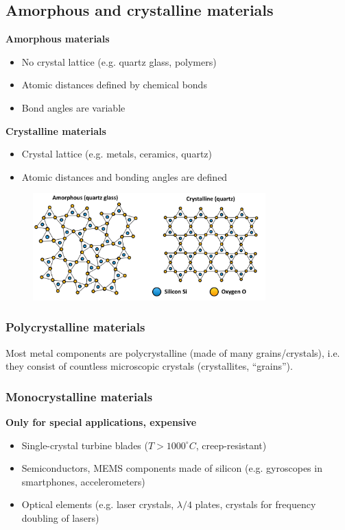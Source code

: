\documentclass{article}
\begin{document}
\subsection{Amorphous and crystalline materials}
\begin{minipage}[t]{0.48\textwidth}
  \textbf{Amorphous materials}
  \begin{itemize}
    \item No crystal lattice (e.g. quartz glass, polymers)
    \item Atomic distances defined by chemical bonds
    \item Bond angles are variable
  \end{itemize}
\end{minipage}
\hfill
\begin{minipage}[t]{0.48\textwidth}
  \textbf{Crystalline materials}
  \begin{itemize}
    \item Crystal lattice (e.g. metals, ceramics, quartz)
    \item Atomic distances and bonding angles are defined
  \end{itemize}
\end{minipage}

\newpage
\begin{figure}[ht!]
  \centering
  \includegraphics[width=0.8\textwidth]{media/amorph_cry.png}
\end{figure}

\subsubsection{Polycrystalline materials}
Most metal components are polycrystalline (made of many grains/crystals),
i.e. they consist of countless microscopic crystals (crystallites, ``grains'').

\subsubsection{Monocrystalline materials}
\textbf{Only for special applications, expensive}
\begin{itemize}
  \item Single-crystal turbine blades ($T>1000^\circ C$, creep-resistant)
  \item Semiconductors, MEMS components made of silicon (e.g. gyroscopes in smartphones, accelerometers)
  \item Optical elements (e.g. laser crystals, $\lambda/4$ plates, crystals for frequency doubling of lasers)
\end{itemize}
\end{document}
